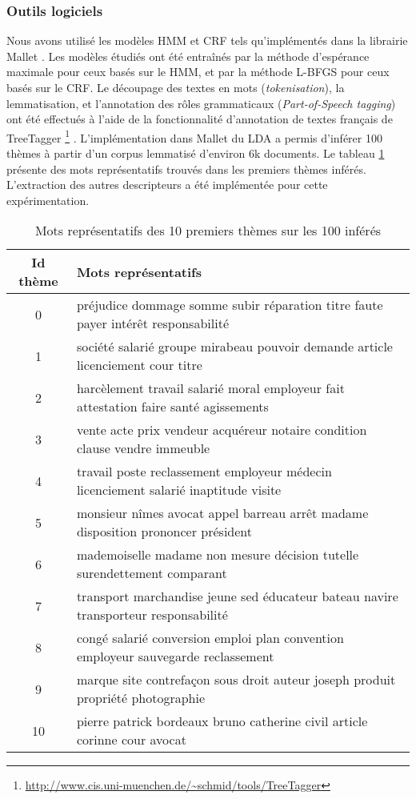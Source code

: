 \subsubsection{Outils logiciels}
Nous avons utilisé les modèles HMM et CRF tels qu'implémentés dans la librairie Mallet \citep{McCallum2012Mallet}. Les modèles étudiés ont été entraînés par la méthode d'espérance maximale pour ceux basés sur le HMM, et par la méthode L-BFGS pour ceux basés sur le CRF. Le découpage des textes en mots (\textit{tokenisation}), la lemmatisation, et l'annotation des rôles grammaticaux (\textit{Part-of-Speech tagging}) ont été effectués à l'aide de la fonctionnalité d'annotation de textes français de TreeTagger \footnote{\url{http://www.cis.uni-muenchen.de/~schmid/tools/TreeTagger}}  \citep{schmid1994treetagger}. L'implémentation dans Mallet du LDA \citep{blei2003lda} a permis d'inférer 100 thèmes à partir d'un corpus lemmatisé d'environ 6k documents. Le tableau \ref{p4_topics} 
présente des mots représentatifs trouvés dans les premiers thèmes inférés. L'extraction des autres descripteurs a été implémentée pour cette expérimentation. 


\begin{table}[!h]
\scriptsize
\begin{center}
\begin{tabular}{c|l}
Id thème & Mots représentatifs  \\ \hline
0	& 	préjudice  dommage  somme  subir  réparation  titre  faute  payer  intérêt  responsabilité  \\ \hline
1	& société  salarié  groupe  mirabeau  pouvoir  demande  article  licenciement  cour  titre    \\ \hline
2	& harcèlement  travail  salarié  moral  employeur  fait  attestation  faire  santé  agissements  \\ \hline
3	& vente  acte  prix  vendeur  acquéreur  notaire  condition  clause  vendre  immeuble  \\ \hline
4	& 		travail  poste  reclassement  employeur  médecin  licenciement  salarié  inaptitude  visite  \\ \hline
5	& 	monsieur  nîmes  avocat  appel  barreau  arrêt  madame  disposition  prononcer  président  \\ \hline
6	& 	mademoiselle  madame  non  mesure  décision  tutelle  surendettement  comparant   \\ \hline
7	& transport  marchandise  jeune  sed  éducateur  bateau  navire  transporteur  responsabilité  \\ \hline
8	&congé  salarié  conversion  emploi  plan  convention  employeur  sauvegarde  reclassement  \\ \hline
9	&marque  site  contrefaçon  sous  droit  auteur  joseph  produit  propriété  photographie  \\ \hline
10	&pierre  patrick  bordeaux  bruno  catherine  civil  article  corinne  cour  avocat\\ \hline
\end{tabular}
\end{center}
\caption{Mots représentatifs des 10 premiers thèmes sur les 100 inférés}\label{p4_topics}
\end{table}

